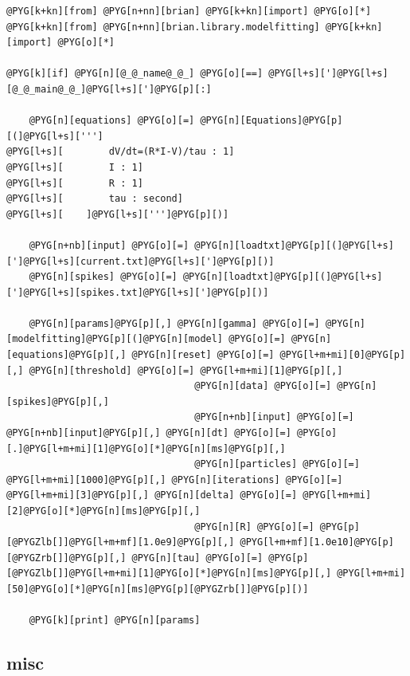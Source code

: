 \documentclass[letterpaper,10pt,english]{manual}
\begin{document}
\begin{Verbatim}[commandchars=@\[\]]
@PYG[k+kn][from] @PYG[n+nn][brian] @PYG[k+kn][import] @PYG[o][*]
@PYG[k+kn][from] @PYG[n+nn][brian.library.modelfitting] @PYG[k+kn][import] @PYG[o][*]

@PYG[k][if] @PYG[n][@_@_name@_@_] @PYG[o][==] @PYG[l+s][']@PYG[l+s][@_@_main@_@_]@PYG[l+s][']@PYG[p][:]

    @PYG[n][equations] @PYG[o][=] @PYG[n][Equations]@PYG[p][(]@PYG[l+s][''']
@PYG[l+s][        dV/dt=(R*I-V)/tau : 1]
@PYG[l+s][        I : 1]
@PYG[l+s][        R : 1]
@PYG[l+s][        tau : second]
@PYG[l+s][    ]@PYG[l+s][''']@PYG[p][)]

    @PYG[n+nb][input] @PYG[o][=] @PYG[n][loadtxt]@PYG[p][(]@PYG[l+s][']@PYG[l+s][current.txt]@PYG[l+s][']@PYG[p][)]
    @PYG[n][spikes] @PYG[o][=] @PYG[n][loadtxt]@PYG[p][(]@PYG[l+s][']@PYG[l+s][spikes.txt]@PYG[l+s][']@PYG[p][)]

    @PYG[n][params]@PYG[p][,] @PYG[n][gamma] @PYG[o][=] @PYG[n][modelfitting]@PYG[p][(]@PYG[n][model] @PYG[o][=] @PYG[n][equations]@PYG[p][,] @PYG[n][reset] @PYG[o][=] @PYG[l+m+mi][0]@PYG[p][,] @PYG[n][threshold] @PYG[o][=] @PYG[l+m+mi][1]@PYG[p][,]
                                 @PYG[n][data] @PYG[o][=] @PYG[n][spikes]@PYG[p][,]
                                 @PYG[n+nb][input] @PYG[o][=] @PYG[n+nb][input]@PYG[p][,] @PYG[n][dt] @PYG[o][=] @PYG[o][.]@PYG[l+m+mi][1]@PYG[o][*]@PYG[n][ms]@PYG[p][,]
                                 @PYG[n][particles] @PYG[o][=] @PYG[l+m+mi][1000]@PYG[p][,] @PYG[n][iterations] @PYG[o][=] @PYG[l+m+mi][3]@PYG[p][,] @PYG[n][delta] @PYG[o][=] @PYG[l+m+mi][2]@PYG[o][*]@PYG[n][ms]@PYG[p][,]
                                 @PYG[n][R] @PYG[o][=] @PYG[p][@PYGZlb[]]@PYG[l+m+mf][1.0e9]@PYG[p][,] @PYG[l+m+mf][1.0e10]@PYG[p][@PYGZrb[]]@PYG[p][,] @PYG[n][tau] @PYG[o][=] @PYG[p][@PYGZlb[]]@PYG[l+m+mi][1]@PYG[o][*]@PYG[n][ms]@PYG[p][,] @PYG[l+m+mi][50]@PYG[o][*]@PYG[n][ms]@PYG[p][@PYGZrb[]]@PYG[p][)]

    @PYG[k][print] @PYG[n][params]
\end{Verbatim}


\subsection{misc}

\resetcurrentobjects
\hypertarget{--doc-examples-misc_adaptive}{}
\end{document}

